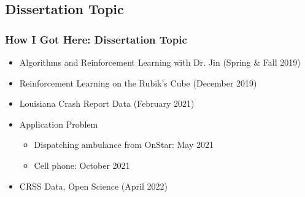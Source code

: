 \subsection{Dissertation Topic}

\begin{frame}[t]
	\frametitle{How I Got Here:  Dissertation Topic}
\Large

	\begin{itemize}
		\item Algorithms and Reinforcement Learning with Dr. Jin (Spring \& Fall 2019)
		\item Reinforcement Learning on the Rubik's Cube (December 2019)
		\item Louisiana Crash Report Data  (February 2021)
		\item Application Problem
		
		\begin{itemize}
			\Large
			\item Dispatching ambulance from OnStar:  May 2021
			\item Cell phone:  October 2021
		\end{itemize}
		
		\item CRSS Data, Open Science (April 2022)
	\end{itemize}

\end{frame}



